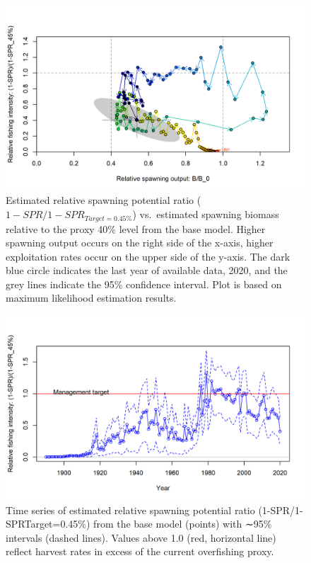 \documentclass[11pt,
  english,
  a4paper,
]{article}
\begin{document}

\begin{figure}
\centering
\includegraphics[width=1\textwidth,height=0.5\textheight]{figs/SPR4_phase.png}
\caption{Estimated relative spawning potential ratio ({\(1-SPR/1-SPR_{Target=0.45\%}\)\leavevmode\tagmcend\tagstructend}) vs.~estimated spawning biomass relative to the proxy 40\% level from the base model. Higher spawning output occurs on the right side of the x-axis, higher exploitation rates occur on the upper side of the y-axis. The dark blue circle indicates the last year of available data, 2020, and the grey lines indicate the 95\% confidence interval. Plot is based on maximum likelihood estimation results.}
\end{figure}

\tagmcend\tagstructend


\begin{figure}
\centering
\includegraphics[width=1\textwidth,height=0.5\textheight]{figs/SPR3_ratiointerval.png}
\caption{Time series of estimated relative spawning potential ratio (1-SPR/1-SPRTarget=0.45\%) from the base model (points) with ∼95\% intervals (dashed lines). Values above 1.0 (red, horizontal line) reflect harvest rates in excess of the current overfishing proxy.}
\end{figure}
\end{document}
